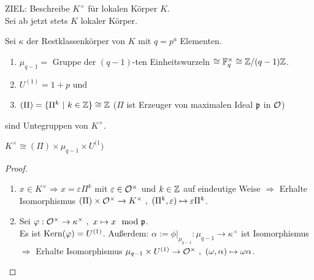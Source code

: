 ZIEL: Beschreibe $K^\times$ für lokalen Körper $K$.\\
Sei ab jetzt stets $K$ lokaler Körper.

\begin{Bem}
Sei $\kappa$ der Restklassenkörper von $K$ mit $q=p^a$ Elementen.
\begin{enumerate}[(1)]
\item $\mu_{q-1}=$ Gruppe der $(q-1)$-ten Einheitswurzeln $\cong \mathbb{F}_q^\times \cong \mathbb{Z}/(q-1)\mathbb{Z}$.
\item $U^{(1)}=1+p$ und
\item $(\Pi)=\{\Pi^k \ | \ k \in \mathbb{Z}\}\cong \mathbb{Z}$ ($\Pi$ ist Erzeuger von maximalen Ideal $\mathfrak{p}$ in $\mathcal{O}$)
\end{enumerate}
sind Untegruppen von $K^\times$.
\end{Bem}

\begin{Prop}
$K^\times \cong (\Pi) \times \mu_{q-1} \times U^{(1})$
\end{Prop}

\begin{proof}
	\begin{enumerate}[(1)]
		\item $x \in K^\times \Rightarrow x= \varepsilon \Pi^k$ mit $\varepsilon \in \mathcal{O}^\times$ und $k \in \mathbb{Z}$ auf eindeutige Weise $\Rightarrow$ Erhalte Isomorphismus $(\Pi)\times \mathcal{O}^\times \to K^\times \ , \ (\Pi^k,\varepsilon) \mapsto \varepsilon \Pi^k$.
		\item Sei $\varphi: \mathcal{O}^\times \to \kappa^\times \ , \ x \mapsto x \mod {\mathfrak{p}}$.\\
		Es ist $\operatorname{Kern}(\varphi)=U^{(1)}$. Außerdem: $\alpha:=\phi|_{\mu_{q-1}}: \mu_{q-1} \to \kappa^\times$ ist Isomorphismus\\
		$\Rightarrow$ Erhalte Isomorphismus $\mu_{q-1}\times U^{(1)} \to \mathcal{O}^\times \ , \ (\omega , \alpha) \mapsto \omega \alpha$.
	\end{enumerate}	
\end{proof}